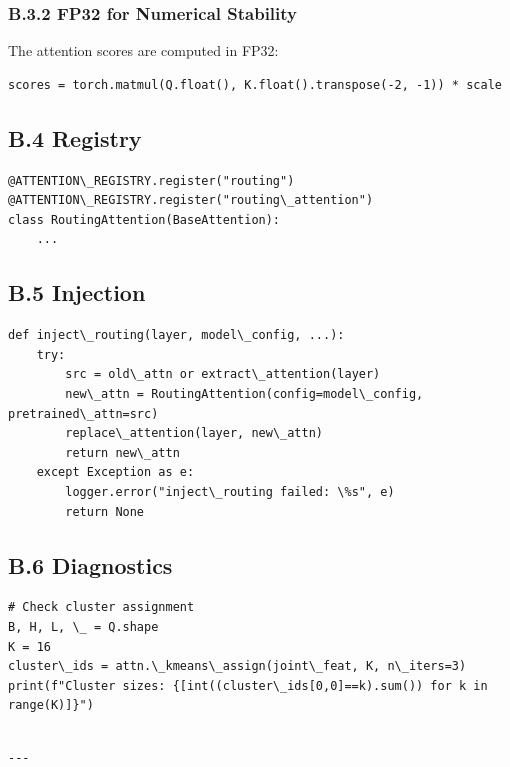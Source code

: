 \subsubsection{B.3.2 FP32 for Numerical Stability}

The attention scores are computed in FP32:

\begin{lstlisting}
scores = torch.matmul(Q.float(), K.float().transpose(-2, -1)) * scale
\end{lstlisting}

\subsection{B.4 Registry}

\begin{lstlisting}
@ATTENTION\_REGISTRY.register("routing")
@ATTENTION\_REGISTRY.register("routing\_attention")
class RoutingAttention(BaseAttention):
    ...
\end{lstlisting}

\subsection{B.5 Injection}

\begin{lstlisting}
def inject\_routing(layer, model\_config, ...):
    try:
        src = old\_attn or extract\_attention(layer)
        new\_attn = RoutingAttention(config=model\_config, pretrained\_attn=src)
        replace\_attention(layer, new\_attn)
        return new\_attn
    except Exception as e:
        logger.error("inject\_routing failed: \%s", e)
        return None
\end{lstlisting}

\subsection{B.6 Diagnostics}

\begin{lstlisting}
# Check cluster assignment
B, H, L, \_ = Q.shape
K = 16
cluster\_ids = attn.\_kmeans\_assign(joint\_feat, K, n\_iters=3)
print(f"Cluster sizes: {[int((cluster\_ids[0,0]==k).sum()) for k in range(K)]}")
\end{lstlisting}
\begin{lstlisting}

---
\end{lstlisting}


